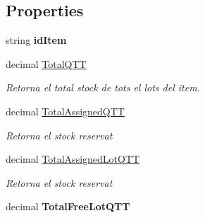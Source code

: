\subsection*{Properties}
\begin{DoxyCompactItemize}
\item 
\mbox{\label{class_h_k_supply_1_1_p_r_j___stocks_1_1_classes_1_1_stocks_1_1_item_afcc42fc748f9fe2a5c1c241e4882b304}} 
string {\bfseries id\+Item}
\item 
decimal \mbox{\hyperlink{class_h_k_supply_1_1_p_r_j___stocks_1_1_classes_1_1_stocks_1_1_item_a76abf0f349a59b2de193fb77c600a8a5}{Total\+Q\+TT}}
\begin{DoxyCompactList}\small\item\em Retorna el total stock de tots el lots del item. \end{DoxyCompactList}\item 
decimal \mbox{\hyperlink{class_h_k_supply_1_1_p_r_j___stocks_1_1_classes_1_1_stocks_1_1_item_a8ccbe83cc666b87e18013c1097b84b13}{Total\+Assigned\+Q\+TT}}
\begin{DoxyCompactList}\small\item\em Retorna el stock reservat \end{DoxyCompactList}\item 
decimal \mbox{\hyperlink{class_h_k_supply_1_1_p_r_j___stocks_1_1_classes_1_1_stocks_1_1_item_a552fb47c225ce03aa591ae1a45eca555}{Total\+Assigned\+Lot\+Q\+TT}}
\begin{DoxyCompactList}\small\item\em Retorna el stock reservat \end{DoxyCompactList}\item 
\mbox{\label{class_h_k_supply_1_1_p_r_j___stocks_1_1_classes_1_1_stocks_1_1_item_a1a432d2bb23094b014fc92b915ebb27d}} 
decimal {\bfseries Total\+Free\+Lot\+Q\+TT}
\item 

\end{DoxyCompactItemize}
